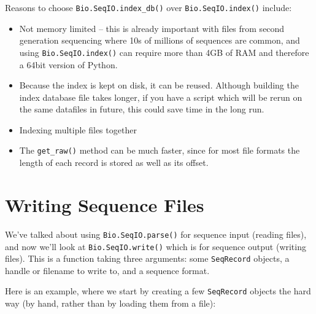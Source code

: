 Reasons to choose \verb|Bio.SeqIO.index_db()| over \verb|Bio.SeqIO.index()|
include:
\begin{itemize}
\item Not memory limited -- this is already important with files from second
generation sequencing where 10s of millions of sequences are common, and
using \verb|Bio.SeqIO.index()| can require more than 4GB of RAM and therefore
a 64bit version of Python.
\item Because the index is kept on disk, it can be reused. Although building
the index database file takes longer, if you have a script which will be
rerun on the same datafiles in future, this could save time in the long run.
\item Indexing multiple files together
\item The \verb|get_raw()| method can be much faster, since for most file
formats the length of each record is stored as well as its offset.
\end{itemize}

\section{Writing Sequence Files}

We've talked about using \verb|Bio.SeqIO.parse()| for sequence input (reading files), and now we'll look at \verb|Bio.SeqIO.write()| which is for sequence output (writing files).  This is a function taking three arguments: some \verb|SeqRecord| objects, a handle or filename to write to, and a sequence format.

Here is an example, where we start by creating a few \verb|SeqRecord| objects the hard way (by hand, rather than by loading them from a file):

